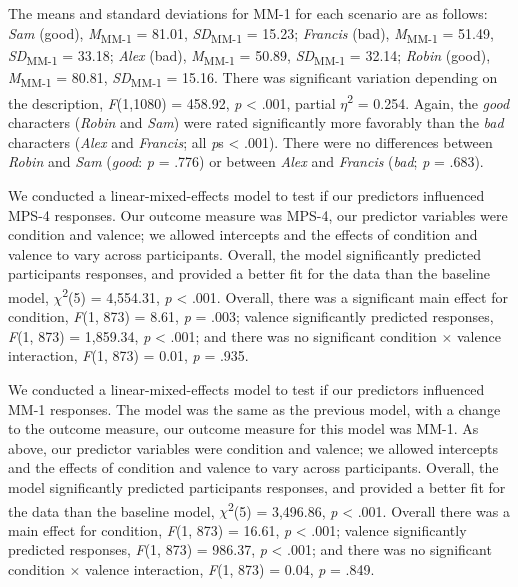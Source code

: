 \documentclass[
  man,floatsintext]{apa6}
\begin{document}
The means and standard deviations for MM-1 for each scenario are as follows:
\emph{Sam} (good),
\emph{M}\textsubscript{MM-1} = 81.01, \emph{SD}\textsubscript{MM-1} = 15.23;
\emph{Francis} (bad),
\emph{M}\textsubscript{MM-1} = 51.49, \emph{SD}\textsubscript{MM-1} = 33.18;
\emph{Alex} (bad),
\emph{M}\textsubscript{MM-1} = 50.89, \emph{SD}\textsubscript{MM-1} = 32.14;
\emph{Robin} (good),
\emph{M}\textsubscript{MM-1} = 80.81, \emph{SD}\textsubscript{MM-1} = 15.16. There was significant variation depending on the description, \emph{F}(1,1080) = 458.92, \emph{p} \textless{} .001, partial \(\eta\)\textsuperscript{2} = 0.254. Again, the \emph{good} characters (\emph{Robin} and \emph{Sam}) were rated significantly more favorably than the \emph{bad} characters (\emph{Alex} and \emph{Francis}; all \emph{p}s \textless{} .001). There were no differences between \emph{Robin} and \emph{Sam} (\emph{good}: \emph{p} = .776) or between \emph{Alex} and \emph{Francis} (\emph{bad}; \emph{p} = .683).

We conducted a linear-mixed-effects model to test if our predictors influenced MPS-4 responses. Our outcome measure was MPS-4, our predictor variables were condition and valence; we allowed intercepts and the effects of condition and valence to vary across participants.
Overall, the model significantly predicted participants responses, and provided a better fit for the data than the baseline model,
\(\chi\)\textsuperscript{2}(5) = 4,554.31, \emph{p} \textless{} .001.
Overall, there was a significant main effect for condition,
\emph{F}(1, 873) = 8.61, \emph{p} = .003;
valence significantly predicted responses,
\emph{F}(1, 873) = 1,859.34, \emph{p} \textless{} .001;
and there was no significant condition \(\times\) valence interaction,
\emph{F}(1, 873) = 0.01, \emph{p} = .935.

We conducted a linear-mixed-effects model to test if our predictors influenced MM-1 responses. The model was the same as the previous model, with a change to the outcome measure, our outcome measure for this model was MM-1. As above, our predictor variables were condition and valence; we allowed intercepts and the effects of condition and valence to vary across participants.
Overall, the model significantly predicted participants responses, and provided a better fit for the data than the baseline model,
\(\chi\)\textsuperscript{2}(5) = 3,496.86, \emph{p} \textless{} .001.
Overall there was a main effect for condition,
\emph{F}(1, 873) = 16.61, \emph{p} \textless{} .001;
valence significantly predicted responses,
\emph{F}(1, 873) = 986.37, \emph{p} \textless{} .001;
and there was no significant condition \(\times\) valence interaction,
\emph{F}(1, 873) = 0.04, \emph{p} = .849.
\end{document}
